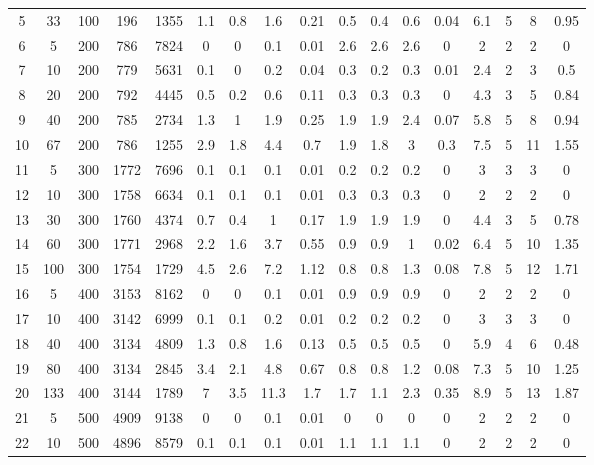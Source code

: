 \documentclass[11pt]{article}
\newcommand{\np}{\newpage}
\begin{document}
\begin{landscape}
\begin{longtable}[c]{ccccc|cccc|cccc|cccc}
		\rowcolor[HTML]{EFEFEF} 
		5 & 33 & 100 & 196 & 1355 & 1.1 & 0.8 & 1.6 & 0.21 & 0.5 & 0.4 & 0.6 & 0.04 & 6.1 & 5 & 8 & 0.95 \\
		6 & 5 & 200 & 786 & 7824 & 0 & 0 & 0.1 & 0.01 & 2.6 & 2.6 & 2.6 & 0 & 2 & 2 & 2 & 0 \\
		7 & 10 & 200 & 779 & 5631 & 0.1 & 0 & 0.2 & 0.04 & 0.3 & 0.2 & 0.3 & 0.01 & 2.4 & 2 & 3 & 0.5 \\
		8 & 20 & 200 & 792 & 4445 & 0.5 & 0.2 & 0.6 & 0.11 & 0.3 & 0.3 & 0.3 & 0 & 4.3 & 3 & 5 & 0.84 \\
		9 & 40 & 200 & 785 & 2734 & 1.3 & 1 & 1.9 & 0.25 & 1.9 & 1.9 & 2.4 & 0.07 & 5.8 & 5 & 8 & 0.94 \\
		10 & 67 & 200 & 786 & 1255 & 2.9 & 1.8 & 4.4 & 0.7 & 1.9 & 1.8 & 3 & 0.3 & 7.5 & 5 & 11 & 1.55 \\
		\rowcolor[HTML]{EFEFEF} 
		11 & 5 & 300 & 1772 & 7696 & 0.1 & 0.1 & 0.1 & 0.01 & 0.2 & 0.2 & 0.2 & 0 & 3 & 3 & 3 & 0 \\
		\rowcolor[HTML]{EFEFEF} 
		12 & 10 & 300 & 1758 & 6634 & 0.1 & 0.1 & 0.1 & 0.01 & 0.3 & 0.3 & 0.3 & 0 & 2 & 2 & 2 & 0 \\
		\rowcolor[HTML]{EFEFEF} 
		13 & 30 & 300 & 1760 & 4374 & 0.7 & 0.4 & 1 & 0.17 & 1.9 & 1.9 & 1.9 & 0 & 4.4 & 3 & 5 & 0.78 \\
		\rowcolor[HTML]{EFEFEF} 
		14 & 60 & 300 & 1771 & 2968 & 2.2 & 1.6 & 3.7 & 0.55 & 0.9 & 0.9 & 1 & 0.02 & 6.4 & 5 & 10 & 1.35 \\
		\rowcolor[HTML]{EFEFEF} 
		15 & 100 & 300 & 1754 & 1729 & 4.5 & 2.6 & 7.2 & 1.12 & 0.8 & 0.8 & 1.3 & 0.08 & 7.8 & 5 & 12 & 1.71 \\
		16 & 5 & 400 & 3153 & 8162 & 0 & 0 & 0.1 & 0.01 & 0.9 & 0.9 & 0.9 & 0 & 2 & 2 & 2 & 0 \\
		17 & 10 & 400 & 3142 & 6999 & 0.1 & 0.1 & 0.2 & 0.01 & 0.2 & 0.2 & 0.2 & 0 & 3 & 3 & 3 & 0 \\
		18 & 40 & 400 & 3134 & 4809 & 1.3 & 0.8 & 1.6 & 0.13 & 0.5 & 0.5 & 0.5 & 0 & 5.9 & 4 & 6 & 0.48 \\
		19 & 80 & 400 & 3134 & 2845 & 3.4 & 2.1 & 4.8 & 0.67 & 0.8 & 0.8 & 1.2 & 0.08 & 7.3 & 5 & 10 & 1.25 \\
		20 & 133 & 400 & 3144 & 1789 & 7 & 3.5 & 11.3 & 1.7 & 1.7 & 1.1 & 2.3 & 0.35 & 8.9 & 5 & 13 & 1.87 \\ \np
		\rowcolor[HTML]{EFEFEF} 
		21 & 5 & 500 & 4909 & 9138 & 0 & 0 & 0.1 & 0.01 & 0 & 0 & 0 & 0 & 2 & 2 & 2 & 0 \\
		\rowcolor[HTML]{EFEFEF} 
		22 & 10 & 500 & 4896 & 8579 & 0.1 & 0.1 & 0.1 & 0.01 & 1.1 & 1.1 & 1.1 & 0 & 2 & 2 & 2 & 0 \\

\end{longtable}
\end{landscape}
\end{document}
